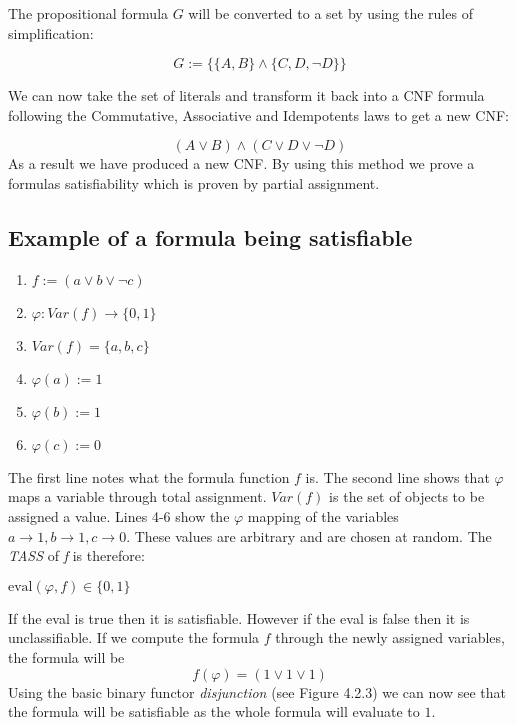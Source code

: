 \documentclass[11pt,a4paper]{report}
\begin{document}
The propositional formula $G$ will be converted to a set by using the rules of simplification:

\begin{displaymath}
 G := \{\{{{A,B}\} \land \{{C,D,\neg D}}\}\}
\end{displaymath}

We can now take the set of literals and transform it back into a CNF formula following the Commutative, Associative and Idempotents laws to get a new CNF:

\begin{displaymath}
(A \lor B) \land (C \lor D \lor \neg D)
\end{displaymath}
As a result we have produced a new CNF. By using this method we prove a formulas satisfiability which is proven by partial assignment.


\subsection{Example of a formula being satisfiable}

\begin{enumerate}
\item $f:= (a \lor b \lor \neg c)$
\item $\varphi: Var (f) \rightarrow \{0,1\}$
\item $Var (f) = \{a,b,c\}$
\item $\varphi(a):= 1$
\item $\varphi(b):= 1$
\item $\varphi(c):= 0$
\end{enumerate}

The first line notes what the formula function $f$ is. The second line shows that $\varphi$ maps a variable through total assignment. $Var(f)$ is the set of objects to be assigned a value. Lines 4-6 show the $\varphi$ mapping of the variables $a \rightarrow 1, b \rightarrow 1, c \rightarrow 0$. These values are arbitrary and are chosen at random.
The \textit{TASS} of \textit{f} is therefore:

\begin{center}
$\text{eval} (\varphi, f) \in \{0,1\}$
\end{center}
If the eval is true then it is satisfiable. However if the eval is false then it is unclassifiable.
If we compute the formula $f$ through the newly assigned variables, the formula will be
\begin{displaymath}
f(\varphi) = (1 \lor 1 \lor 1)
\end{displaymath}
Using the basic binary functor \emph{disjunction} (see Figure 4.2.3) we can now see that the formula will be satisfiable as the whole formula will evaluate to $1$.
\end{document}

